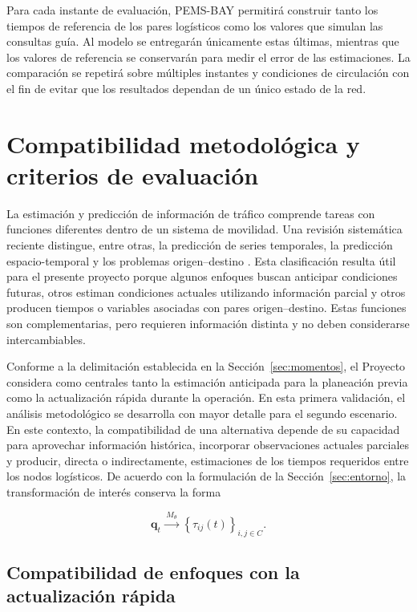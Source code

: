 \documentclass[11pt]{article}
\begin{document}
Para cada instante de evaluación, PEMS-BAY permitirá construir tanto los
tiempos de referencia de los pares logísticos como los valores que simulan
las consultas guía. Al modelo se entregarán únicamente estas últimas, mientras
que los valores de referencia se conservarán para medir el error de las
estimaciones. La comparación se repetirá sobre múltiples instantes y
condiciones de circulación con el fin de evitar que los resultados dependan
de un único estado de la red.

\section{Compatibilidad metodológica y criterios de evaluación}

La estimación y predicción de información de tráfico comprende tareas con
funciones diferentes dentro de un sistema de movilidad. Una revisión
sistemática reciente distingue, entre otras, la predicción de series
temporales, la predicción espacio-temporal y los problemas origen--destino
\citep{du2025survey}. Esta clasificación resulta útil para el presente
proyecto porque algunos enfoques buscan anticipar condiciones futuras, otros
estiman condiciones actuales utilizando información parcial y otros producen
tiempos o variables asociadas con pares origen--destino. Estas funciones son
complementarias, pero requieren información distinta y no deben considerarse
intercambiables.

Conforme a la delimitación establecida en la Sección~\ref{sec:momentos}, el
Proyecto considera como centrales tanto la estimación anticipada para la
planeación previa como la actualización rápida durante la operación. En esta
primera validación, el análisis metodológico se desarrolla con mayor detalle
para el segundo escenario. En este contexto, la compatibilidad de una
alternativa depende de su capacidad para aprovechar información histórica,
incorporar observaciones actuales parciales y producir, directa o
indirectamente, estimaciones de los tiempos requeridos entre los nodos
logísticos. De acuerdo con la formulación
de la Sección~\ref{sec:entorno}, la transformación de interés conserva la forma

\[
\mathbf{q}_t
\xrightarrow{\;M_{\theta}\;}
\left\{
\widehat{\tau}_{ij}(t)
\right\}_{i,j\in C}.
\]


\subsection{Compatibilidad de enfoques con la actualización rápida}
\end{document}
